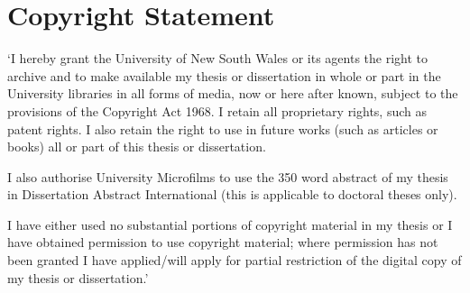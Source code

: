 \chapter*{Copyright Statement}
`I hereby grant the University of New South Wales or its agents the right to archive and to make available my thesis or dissertation in whole or part in the University libraries in all forms of media, now or here after known, subject to the provisions of the Copyright Act 1968. I retain all proprietary rights, such as patent rights. I also retain the right to use in future works (such as articles or books) all or part of this thesis or dissertation.

I also authorise University Microfilms to use the 350 word abstract of my thesis in Dissertation Abstract International (this is applicable to doctoral theses only).

I have either used no substantial portions of copyright material in my thesis or I have obtained permission to use copyright material; where permission has not been granted I have applied/will apply for partial restriction of the digital copy of my thesis or dissertation.'
\\
\newpage
